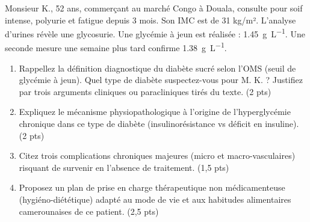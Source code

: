 \documentclass[11pt]{article}
\begin{document}
\begin{exercice}
Monsieur K., 52 ans, commerçant au marché Congo à Douala, consulte pour soif intense, polyurie et fatigue depuis 3 mois. Son IMC est de 31 kg/m². L'analyse d'urines révèle une glycosurie. Une glycémie à jeun est réalisée : \SI{1,45}{g.L^{-1}}. Une seconde mesure une semaine plus tard confirme \SI{1,38}{g.L^{-1}}.

\begin{enumerate}
    \item Rappellez la définition diagnostique du diabète sucré selon l'OMS (seuil de glycémie à jeun). Quel type de diabète suspectez-vous pour M. K. ? Justifiez par trois arguments cliniques ou paracliniques tirés du texte. \hfill (2 pts)
    \item Expliquez le mécanisme physiopathologique à l'origine de l'hyperglycémie chronique dans ce type de diabète (insulinorésistance vs déficit en insuline). \hfill (2 pts)
    \item Citez trois complications chroniques majeures (micro et macro-vasculaires) risquant de survenir en l'absence de traitement. \hfill (1,5 pts)
    \item Proposez un plan de prise en charge thérapeutique non médicamenteuse (hygiéno-diététique) adapté au mode de vie et aux habitudes alimentaires camerounaises de ce patient. \hfill (2,5 pts)
\end{enumerate}
\end{exercice}
\end{document}
